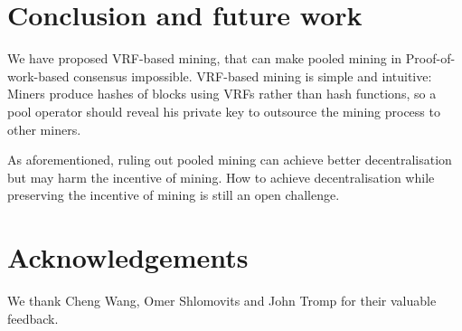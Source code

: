 \documentclass[a0,portrait]{a0poster}
\begin{document}
\begin{multicols}{2}
    \section*{Conclusion and future work}

    We have proposed VRF-based mining, that can make pooled mining in Proof-of-work-based consensus impossible.
    VRF-based mining is simple and intuitive: Miners produce hashes of blocks using VRFs rather than hash functions, so a pool operator should reveal his private key to outsource the mining process to other miners.

    As aforementioned, ruling out pooled mining can achieve better decentralisation but may harm the incentive of mining.
    How to achieve decentralisation while preserving the incentive of mining is still an open challenge.




    \section*{Acknowledgements}

    We thank Cheng Wang, Omer Shlomovits and John Tromp for their valuable feedback.


\end{multicols}
\end{document}
